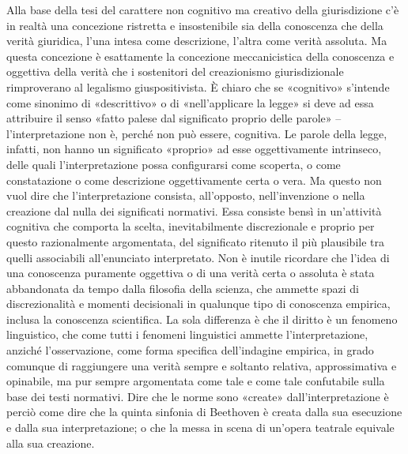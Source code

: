Alla base della tesi del carattere non cognitivo ma creativo della giurisdizione c’è in realtà una concezione ristretta e insostenibile sia della conoscenza che della verità giuridica, l’una intesa come descrizione, l’altra come verità assoluta. Ma questa concezione è esattamente la concezione meccanicistica della conoscenza e oggettiva della verità che i sostenitori del creazionismo giurisdizionale rimproverano al legalismo giuspositivista. È chiaro che se «cognitivo» s’intende come sinonimo di «descrittivo» o di «nell’applicare la legge» si deve ad essa attribuire il senso «fatto palese dal significato proprio delle parole» – l’interpretazione non è, perché non può essere, cognitiva. Le parole della legge, infatti, non hanno un significato «proprio» ad esse oggettivamente intrinseco, delle quali l’interpretazione possa configurarsi come scoperta, o come constatazione o come descrizione oggettivamente certa o vera. Ma questo non vuol dire che l’interpretazione consista, all’opposto, nell’invenzione o nella creazione dal nulla dei significati normativi. Essa consiste bensì in un’attività cognitiva che comporta la scelta, inevitabilmente discrezionale e proprio per questo razionalmente argomentata, del significato ritenuto il più plausibile tra quelli associabili all’enunciato interpretato. Non è inutile ricordare che l’idea di una conoscenza puramente oggettiva o di una verità certa o assoluta è stata abbandonata da tempo dalla filosofia della scienza, che ammette spazi di discrezionalità e momenti decisionali in qualunque tipo di conoscenza empirica, inclusa la conoscenza scientifica. La sola differenza è che il diritto è un fenomeno linguistico, che come tutti i fenomeni linguistici ammette l’interpretazione, anziché l’osservazione, come forma specifica dell’indagine empirica, in grado comunque di raggiungere una verità sempre e soltanto relativa, approssimativa e opinabile, ma pur sempre argomentata come tale e come tale confutabile sulla base dei testi normativi. Dire che le norme sono «create» dall’interpretazione è perciò come dire che la quinta sinfonia di Beethoven è creata dalla sua esecuzione e dalla sua interpretazione; o che la messa in scena di un’opera teatrale equivale alla sua creazione.
